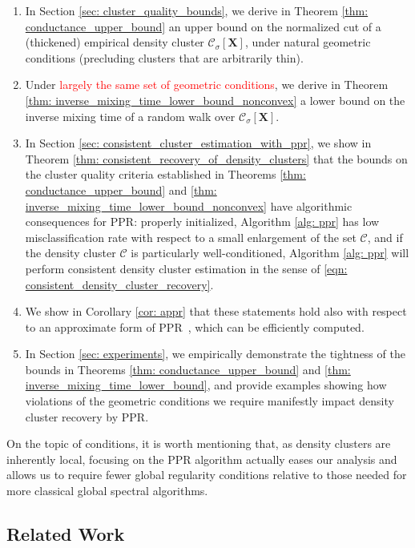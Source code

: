 \documentclass{article}
\newcommand{\1}{\mathbf{1}}
\newcommand{\Xbf}{\mathbf{X}}
\newcommand{\Cset}{\mathcal{C}}
\newcommand{\Csig}{\Cset_{\sigma}}
\newcommand{\ppr}{{\sc PPR}}
\newcommand{\pprspace}{{\sc PPR~}}
\theoremstyle{aldenthm}
\theoremstyle{aldenrmrk}
\begin{document}
\begin{enumerate}
\item In Section \ref{sec: cluster_quality_bounds}, we derive in Theorem
  \ref{thm: conductance_upper_bound} an upper bound on the normalized cut of a  
  (thickened) empirical density cluster $\Csig[\Xbf]$, under natural geometric 
  conditions (precluding clusters that are arbitrarily thin).  

\item Under \textcolor{red}{largely the same set of geometric conditions}, we derive in Theorem
  \ref{thm: inverse_mixing_time_lower_bound_nonconvex} a lower bound on the
  inverse mixing time of a random walk over $\Csig[\Xbf]$.
	
\item In Section \ref{sec: consistent_cluster_estimation_with_ppr}, we show in
  Theorem \ref{thm: consistent_recovery_of_density_clusters} that the bounds on the cluster quality criteria established in Theorems \ref{thm: conductance_upper_bound} and \ref{thm:
    inverse_mixing_time_lower_bound_nonconvex} have algorithmic consequences for \ppr: 
  properly initialized, Algorithm \ref{alg: ppr} has low misclassification rate with respect to a small enlargement of the set $\Cset$, and if the density cluster $\Cset$ is particularly well-conditioned, Algorithm \ref{alg: ppr} will perform consistent density cluster estimation in the sense of \eqref{eqn: consistent_density_cluster_recovery}. 
	
\item We show in Corollary \ref{cor: appr} that these statements hold also with respect to an approximate form of \pprspace, which can be efficiently computed.

\item In Section \ref{sec: experiments}, we empirically
  demonstrate the tightness of the bounds in Theorems \ref{thm: conductance_upper_bound} and \ref{thm: inverse_mixing_time_lower_bound}, and provide examples showing how violations of the geometric conditions we require manifestly
  impact density cluster recovery by \ppr.  
\end{enumerate}

On the topic of conditions, it is worth mentioning that, as density clusters
are inherently local, focusing on the PPR algorithm actually eases our analysis
and allows us to require fewer global regularity conditions relative to those
needed for more classical global spectral algorithms.    

\subsection{Related Work}
\end{document}
